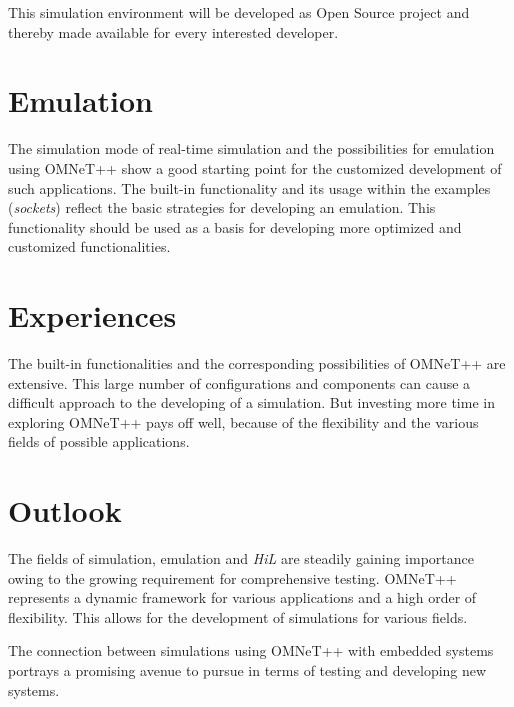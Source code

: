 This simulation environment will be developed as Open Source project and thereby made available for every interested developer.

\section{Emulation}
\label{sec:conclusion_emulation}
The simulation mode of real-time simulation and the possibilities for emulation using OMNeT++  show a good starting point for the customized development of such applications.
The built-in functionality and its usage within the examples (\emph{sockets}) reflect the basic strategies for developing an emulation.
This functionality should be used as a basis for developing more optimized and customized functionalities.

\section{Experiences}
\label{sec:conclusion_experiences}
The built-in functionalities and the corresponding possibilities of OMNeT++ are extensive.
This large number of configurations and components can cause a difficult approach to the developing of a simulation.
But investing more time in exploring OMNeT++ pays off well, because of the flexibility and the various fields of possible applications.

\section{Outlook}
\label{sec:conclusion_outlook}
The fields of simulation, emulation and \emph{HiL} are steadily gaining importance owing to the growing requirement for comprehensive testing.
OMNeT++ represents a dynamic framework for various applications and a high order of flexibility.
This allows for the development of simulations for various fields.

The connection between simulations using OMNeT++ with embedded systems portrays a promising avenue to pursue in terms of testing and developing new systems.